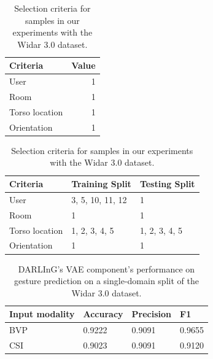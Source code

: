 \begin{table}[t]
	\centering
	\begin{subtable}{0.3\textwidth}
		\centering
		\begin{tabular}{@{}lr@{}}
			\toprule
			Criteria       & Value \\ \midrule
			User           & 1     \\
			Room           & 1     \\
			Torso location & 1     \\
			Orientation    & 1     \\ \bottomrule
		\end{tabular}
		\caption{Single-domain split criteria.}
		\label{tab:single-domain-select}
	\end{subtable}
	\hfill
	\begin{subtable}{0.68\textwidth}
		\centering
		\begin{tabular}{@{}lll@{}}
			\toprule
			Criteria       & Training Split      & Testing Split \\ \midrule
			User           & 3, 5, 10, 11, 12    & 1             \\
			Room           & 1                   & 1             \\
			Torso location & 1, 2, 3, 4, 5       & 1, 2, 3, 4, 5 \\
			Orientation    & 1                   & 1             \\ \bottomrule
		\end{tabular}
		\caption{Single user leave out criteria.}
		\label{tab:single-user-select}
	\end{subtable}
	\caption{Selection criteria for samples in our experiments with the Widar 3.0 dataset.}

\end{table}

\begin{table}[b]
	\centering
	\begin{tabular}{@{}llll@{}}
		\toprule
		Input modality     & Accuracy & Precision & F1     \\ \midrule
		BVP                & 0.9222   & 0.9091    & 0.9655 \\
		CSI                & 0.9023   & 0.9091    & 0.9120 \\ \bottomrule
	\end{tabular}
	\caption{DARLInG's VAE component's performance on gesture prediction on a single-domain split of the Widar 3.0 dataset.}
	\label{tab:single-domain-performance}
\end{table}

